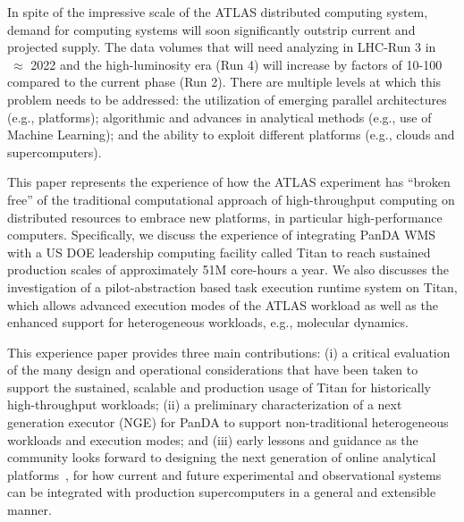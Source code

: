 In spite of the impressive scale of the ATLAS distributed computing system,
demand for computing systems will soon significantly outstrip current and
projected supply.   The data volumes that will need analyzing in LHC-Run 3 in
$~\approx$ 2022 and the high-luminosity era (Run 4) will increase by factors
of 10-100 compared to the current phase (Run 2). There are multiple levels at
which this problem needs to be addressed: the utilization of emerging parallel
architectures (e.g., platforms); algorithmic and advances in analytical
methods (e.g., use of Machine Learning); and the ability to exploit different
platforms (e.g., clouds and supercomputers).



This paper represents the experience of how the ATLAS experiment has ``broken
free'' of the traditional computational approach of high-throughput computing
on distributed resources to embrace new platforms, in particular  
high-performance computers. Specifically, we discuss the experience of integrating
PanDA WMS with a US DOE leadership computing facility called Titan to reach
sustained production scales of approximately 51M core-hours a year. We also
discusses the investigation of a pilot-abstraction based task execution
runtime system on Titan, which allows advanced execution modes of the ATLAS
workload as well as the enhanced support for heterogeneous workloads, e.g.,
molecular dynamics.


This experience paper provides three main contributions:  (i) a critical
evaluation of the many design and operational considerations that have been
taken to support the sustained, scalable and production usage of Titan for
historically high-throughput workloads; (ii) a preliminary characterization
of a next generation executor (NGE) for PanDA to support non-traditional
heterogeneous workloads and execution modes;  and (iii) early lessons and
guidance as the community looks forward to designing the next generation of
online analytical platforms~\cite{foap-url}, for how current and future
experimental and observational systems can be integrated with production
supercomputers in a general and extensible manner.

